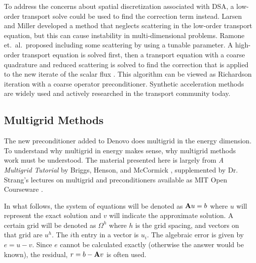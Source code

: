 To address the concerns about spatial discretization associated with DSA, a low-order transport solve could be used to find the correction term instead. Larsen and Miller developed a method that neglects scattering in the low-order transport equation, but this can cause instability in multi-dimensional problems. Ramone et.\ al.\ proposed including some scattering by using a tunable parameter. A high-order transport equation is solved first, then a transport equation with a coarse quadrature and reduced scattering is solved to find the correction that is applied to the new iterate of the scalar flux \cite{Ramone1997}. This algorithm can be viewed as Richardson iteration with a coarse operator preconditioner. Synthetic acceleration methods are widely used and actively researched in the transport community today.

\subsection{Multigrid Methods}
The new preconditioner added to Denovo does multigrid in the energy dimension. To understand why multigrid in energy makes sense, why multigrid methods work must be understood. The material presented here is largely from \emph{A Multigrid Tutorial} by Briggs, Henson, and McCormick \cite{Briggs2000}, supplemented by Dr. Strang's lectures on multigrid and preconditioners available as MIT Open Courseware \cite{Strang}.

In what follows, the system of equations will be denoted as $\mathbf{A}u=b$ where $u$ will represent the exact solution and $v$ will indicate the approximate solution.  A certain grid will be denoted as $\Omega^{h}$ where $h$ is the grid spacing, and vectors on that grid are $u^{h}$. The $i$th entry in a vector is $u_{i}$. The algebraic error is given by $e = u - v$. Since $e$ cannot be calculated exactly (otherwise the answer would be known), the residual, $r = b - \mathbf{A}v$ is often used. 

